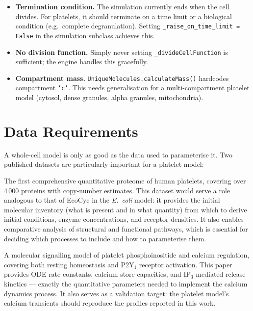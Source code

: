 \documentclass[11pt,a4paper]{article}
\begin{document}
\begin{itemize}[nosep]
  \item \textbf{Termination condition.}  The simulation currently ends when the
    cell divides.  For platelets, it should terminate on a time limit or a
    biological condition (e.g.\ complete degranulation).  Setting
    \texttt{\_raise\_on\_time\_limit = False} in the simulation subclass
    achieves this.
  \item \textbf{No division function.}  Simply never setting
    \texttt{\_divideCellFunction} is sufficient; the engine handles this
    gracefully.
  \item \textbf{Compartment mass.}  \texttt{UniqueMolecules.calculateMass()}
    hardcodes compartment \texttt{`c'}.  This needs generalisation for a
    multi-compartment platelet model (cytosol, dense granules, alpha granules,
    mitochondria).
\end{itemize}


\section{Data Requirements}
\label{sec:data}

A whole-cell model is only as good as the data used to parameterise it.
Two published datasets are particularly important for a platelet model:

\begin{description}[style=nextline, leftmargin=0.5cm]
  \item[Burkhart et al.\ (2012)~\cite{Burkhart2012}]
    The first comprehensive quantitative proteome of human platelets, covering
    over 4\,000 proteins with copy-number estimates.  This dataset would serve
    a role analogous to that of EcoCyc in the \textit{E.~coli} model: it
    provides the initial molecular inventory (what is present and in what
    quantity) from which to derive initial conditions, enzyme concentrations,
    and receptor densities.  It also enables comparative analysis of structural
    and functional pathways, which is essential for deciding which processes to
    include and how to parameterise them.

  \item[Purvis et al.\ (2008)~\cite{Purvis2008}]
    A molecular signalling model of platelet phosphoinositide and calcium
    regulation, covering both resting homeostasis and P2Y$_1$ receptor
    activation.  This paper provides ODE rate constants, calcium store
    capacities, and IP$_3$-mediated release kinetics --- exactly the
    quantitative parameters needed to implement the calcium dynamics process.
    It also serves as a validation target: the platelet model's calcium
    transients should reproduce the profiles reported in this work.
\end{description}
\end{document}
